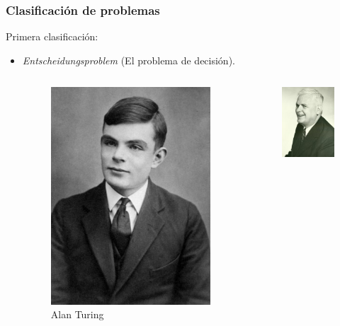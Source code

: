\begin{frame}
\frametitle{Clasificación de problemas}

Primera clasificación:

\begin{itemize}
\item \textit{Entscheidungsproblem} (El problema de decisión).
\pause
\begin{columns}
\begin{figure}
\includegraphics[scale=0.096]{./images/Turing.jpg}
\caption{Alan Turing}
\end{figure}
\begin{figure}
\includegraphics[scale=0.3]{./images/Church.jpg}

\end{figure}
\end{columns}
\end{itemize}
\end{frame}
